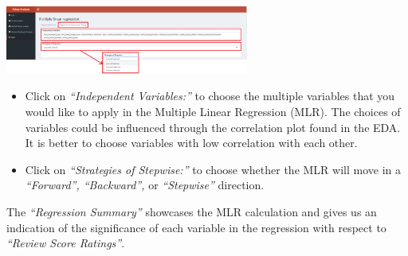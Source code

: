 \documentclass[
]{article}
\providecommand{\tightlist}{%
  \setlength{\itemsep}{0pt}\setlength{\parskip}{0pt}}
\begin{document}
\includegraphics[width=0.6\textwidth,height=\textheight]{images/mlr3.png}

\begin{itemize}
\tightlist
\item
  Click on \emph{``Independent Variables:''} to choose the multiple
  variables that you would like to apply in the Multiple Linear
  Regression (MLR). The choices of variables could be influenced through
  the correlation plot found in the EDA. It is better to choose
  variables with low correlation with each other.
\item
  Click on \emph{``Strategies of Stepwise:''} to choose whether the MLR
  will move in a \emph{``Forward'', ``Backward'',} or
  \emph{``Stepwise''} direction.
\end{itemize}

The \emph{``Regression Summary''} showcases the MLR calculation and
gives us an indication of the significance of each variable in the
regression with respect to \emph{``Review Score Ratings''}.
\end{document}
